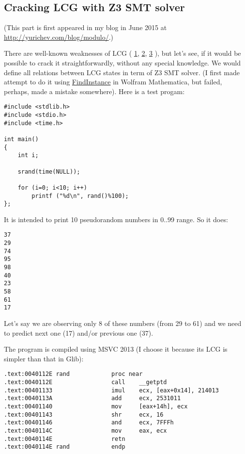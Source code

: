\subsection{Cracking \ac{LCG} with Z3 \ac{SMT} solver}

(This part is first appeared in my blog in June 2015 at \url{http://yurichev.com/blog/modulo/}.)

There are well-known weaknesses of LCG (
\href{http://en.wikipedia.org/wiki/Linear_congruential_generator#Advantages_and_disadvantages_of_LCGs}{1},
\href{http://www.reteam.org/papers/e59.pdf}{2},
\href{http://stackoverflow.com/questions/8569113/why-1103515245-is-used-in-rand/8574774#8574774}{3}
), but let's see, if it would be possible to crack it straightforwardly, without any special knowledge.
We would define all relations between LCG states in term of Z3 \ac{SMT} solver.
(I first made attempt to do it using \href{https://reference.wolfram.com/language/ref/FindInstance.html}{FindInstance} in Wolfram Mathematica, but failed, perhaps, made a mistake somewhere).
Here is a test progam:

\begin{lstlisting}
#include <stdlib.h>
#include <stdio.h>
#include <time.h>

int main()
{
	int i;

	srand(time(NULL));

	for (i=0; i<10; i++)
		printf ("%d\n", rand()%100);
};
\end{lstlisting}

It is intended to print 10 pseudorandom numbers in 0..99 range.
So it does:

\begin{lstlisting}
37
29
74
95
98
40
23
58
61
17
\end{lstlisting}

Let's say we are observing only 8 of these numbers (from 29 to 61) and we need to predict next one (17) and/or previous one (37).

The program is compiled using MSVC 2013 (I choose it because its LCG is simpler than that in Glib):

\begin{lstlisting}
.text:0040112E rand            proc near
.text:0040112E                 call    __getptd
.text:00401133                 imul    ecx, [eax+0x14], 214013
.text:0040113A                 add     ecx, 2531011
.text:00401140                 mov     [eax+14h], ecx
.text:00401143                 shr     ecx, 16
.text:00401146                 and     ecx, 7FFFh
.text:0040114C                 mov     eax, ecx
.text:0040114E                 retn
.text:0040114E rand            endp
\end{lstlisting}

